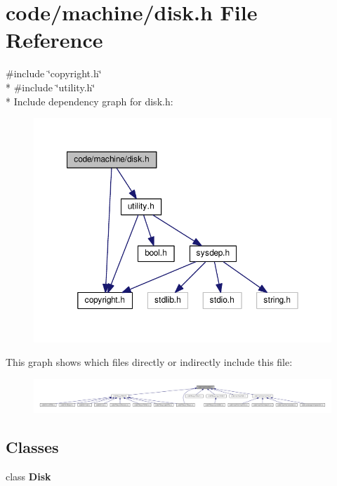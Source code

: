 \section{code/machine/disk.h File Reference}
\label{disk_8h}
{\ttfamily \#include \char`\"{}copyright.\+h\char`\"{}}\\*
{\ttfamily \#include \char`\"{}utility.\+h\char`\"{}}\\*
Include dependency graph for disk.\+h\+:
\nopagebreak
\begin{figure}[H]
\begin{center}
\leavevmode
\includegraphics[width=350pt]{disk_8h__incl}
\end{center}
\end{figure}
This graph shows which files directly or indirectly include this file\+:
\nopagebreak
\begin{figure}[H]
\begin{center}
\leavevmode
\includegraphics[width=350pt]{disk_8h__dep__incl}
\end{center}
\end{figure}
\subsection*{Classes}
\begin{DoxyCompactItemize}
\item 
class {\bf Disk}
\end{DoxyCompactItemize}
